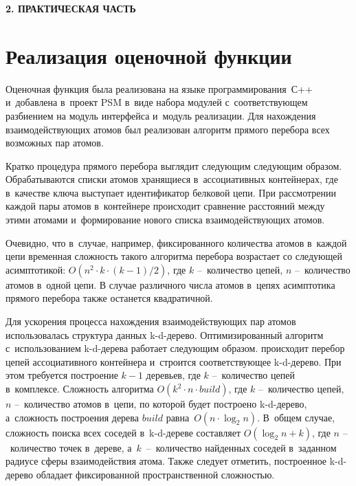 \newpage
\begin{center}
	\textbf{\large 2. ПРАКТИЧЕСКАЯ ЧАСТЬ}
\end{center}


\section{Реализация оценочной функции}

Оценочная функция была реализована на языке программирования~С++ и~добавлена в~проект PSM в~виде набора модулей с~соответствующем разбиением на модуль интерфейса и~модуль реализации. Для нахождения взаимодействующих атомов был реализован алгоритм прямого перебора всех возможных пар атомов. 

Кратко процедура прямого перебора выглядит следующим следующим образом. Обрабатываются списки атомов хранящиеся в~ассоциативных контейнерах, где в~качестве ключа выступает идентификатор белковой цепи. При рассмотрении каждой пары атомов в~контейнере происходит сравнение расстояний между этими атомами и~формирование нового списка взаимодействующих атомов.

Очевидно, что в~случае, например, фиксированного количества атомов в~каждой цепи временная сложность такого алгоритма перебора возрастает со следующей асимптотикой: $O(n^2{\cdot}k{\cdot}(k-1)/2)$, где $k$ --~количество цепей, $n$ --~количество атомов в~одной цепи. В случае различного числа атомов в~цепях асимптотика прямого перебора также останется квадратичной.

Для ускорения процесса нахождения взаимодействующих пар атомов использовалась структура данных k-d-дерево. Оптимизированный алгоритм с~использованием k-d-дерева работает следующим образом. происходит перебор цепей ассоциативного контейнера и~строится соответствующее k-d-дерево. При этом требуется построение $k-1$ деревьев, где $k$ --~количество цепей в~комплексе. Сложность алгоритма $O(k^2 \cdot n \cdot build)$, где $k$ --~количество цепей, $n$ --~количество атомов в~цепи, по которой будет построено k-d-дерево, а~сложность построения дерева $build$ равна~$O(n \cdot \log_{2}{n})$. В~общем случае, сложность поиска всех соседей в~k-d-дереве составляет $O(\log_{2}{n} + k)$, где $n$ --~количество точек в~дереве, а~$k$~--~количество найденных соседей в~заданном радиусе сферы взаимодействия атома. Также следует отметить, построенное k-d-дерево обладает фиксированной пространственной сложностью.

